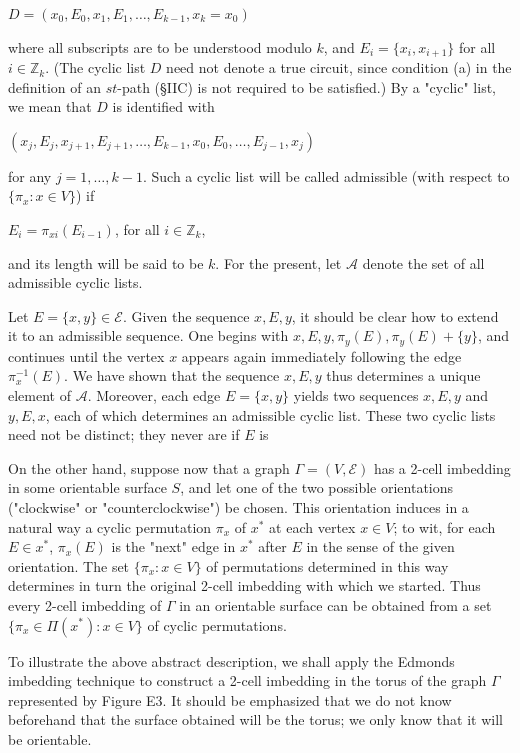 $D = (x_0, E_0, x_1, E_1, \ldots, E_{k-1}, x_k = x_0)$

where all subscripts are to be understood modulo $k$, and $E_i = \{x_i, x_{i+1}\}$ for all $i \in \mathbb{Z}_k$. (The cyclic list $D$ need not denote a true circuit, since condition (a) in the definition of an $st$-path (§IIC) is not required to be satisfied.) By a "cyclic" list, we mean that $D$ is identified with

$(x_j, E_j, x_{j+1}, E_{j+1}, \ldots, E_{k-1}, x_0, E_0, \ldots, E_{j-1}, x_j)$

for any $j = 1, \ldots, k-1$. Such a cyclic list will be called admissible (with respect to $\{\pi_x : x \in V\}$) if

$E_i = \pi_{xi}(E_{i-1})$, for all $i \in \mathbb{Z}_k$,

and its length will be said to be $k$. For the present, let $\mathcal{A}$ denote the set of all admissible cyclic lists.

Let $E = \{x, y\} \in \mathcal{E}$. Given the sequence $x, E, y$, it should be clear how to extend it to an admissible sequence. One begins with $x, E, y, \pi_y(E), \pi_y(E) + \{y\}$, and continues until the vertex $x$ appears again immediately following the edge $\pi_x^{-1}(E)$. We have shown that the sequence $x, E, y$ thus determines a unique element of $\mathcal{A}$. Moreover, each edge $E = \{x, y\}$ yields two sequences $x, E, y$ and $y, E, x$, each of which determines an admissible cyclic list. These two cyclic lists need not be distinct; they never are if $E$ is

On the other hand, suppose now that a graph $\Gamma = (V, \mathcal{E})$ has a 2-cell imbedding in some orientable surface $S$, and let one of the two possible orientations ("clockwise" or "counterclockwise") be chosen. This orientation induces in a natural way a cyclic permutation $\pi_x$ of $x^*$ at each vertex $x \in V$; to wit, for each $E \in x^*$, $\pi_x(E)$ is the "next" edge in $x^*$ after $E$ in the sense of the given orientation. The set $\{\pi_x : x \in V\}$ of permutations determined in this way determines in turn the original 2-cell imbedding with which we started. Thus every 2-cell imbedding of $\Gamma$ in an orientable surface can be obtained from a set $\{\pi_x \in \Pi(x^*) : x \in V\}$ of cyclic permutations.

To illustrate the above abstract description, we shall apply the Edmonds imbedding technique to construct a 2-cell imbedding in the torus of the graph $\Gamma$ represented by Figure E3. It should be emphasized that we do not know beforehand that the surface obtained will be the torus; we only know that it will be orientable.

